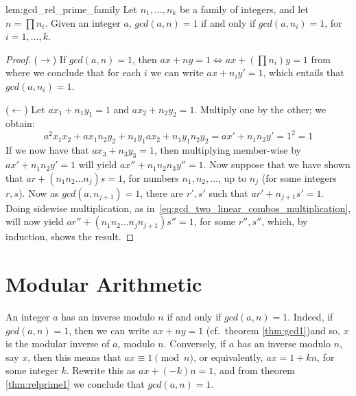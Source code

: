   \begin{replemma}{lem:gcd_rel_prime_family}
    Let $n_1, \dots, n_k$ be a family of integers, and let $n = \prod n_i$. Given an integer $a$, $gcd(a, n) = 1$ if and only if $gcd(a, n_i) = 1$, for $i = 1, \dots, k$.
  \end{replemma}
  \begin{proof}
    ($\rightarrow$) If $gcd(a, n) = 1$, then $ax+ny = 1 \Leftrightarrow ax + \left( \prod n_i \right)y = 1$ from where we conclude that for each $i$ we can write $ax + n_iy' = 1$, which entails that $gcd(a, n_i) = 1$.

    ($\leftarrow$) Let $ax_1 + n_1y_1 = 1$ and $ax_2 + n_2y_2 = 1$. Multiply one by the other; we obtain:
    \begin{equation}
      \label{eq:gcd_two_linear_combos_multiplication}
      a^2x_1x_2 + ax_1n_2y_2 + n_1y_1ax_2 + n_1y_1n_2y_2 = ax' + n_1n_2y' = 1^2 = 1
    \end{equation}
    If we now have that $ax_3 + n_3y_3 = 1$, then multiplying member-wise by $ax' + n_1n_2y' = 1$ will yield $ax'' + n_1n_2n_3y'' = 1$. Now suppose that we have shown that $ar + (n_1n_2\dots n_j)s = 1$, for numbers $n_1, n_2, \dots$, up to $n_j$ (for some integers $r, s$). Now as $gcd(a, n_{j+1}) = 1$, there are $r', s'$ such that $ar' + n_{j+1}s' = 1$. Doing sidewise multiplication, as in~\eqref{eq:gcd_two_linear_combos_multiplication}, will now yield $ar'' + (n_1n_2\dots n_jn_{j+1})s'' = 1$, for some $r'', s''$, which, by induction, shows the result.
  \end{proof}

\section{Modular Arithmetic}
  \label{sec:modular_arith}
  An integer $a$ has an inverse modulo $n$ if and only if $gcd(a, n) = 1$. Indeed, if $gcd(a, n) = 1$, then we can write $ax + ny = 1$ (cf.\ theorem \ref{thm:gcd1})\emd and so, $x$ is the modular inverse of $a$, modulo $n$. Conversely, if $a$ has an inverse modulo $n$, say $x$, then this means that $ax \equiv 1 \pmod{n}$, or equivalently, $ax = 1 + kn$, for some integer $k$. Rewrite this as $ax + (-k)n = 1$, and from theorem \ref{thm:relprime1} we conclude that $gcd(a, n) = 1$.

